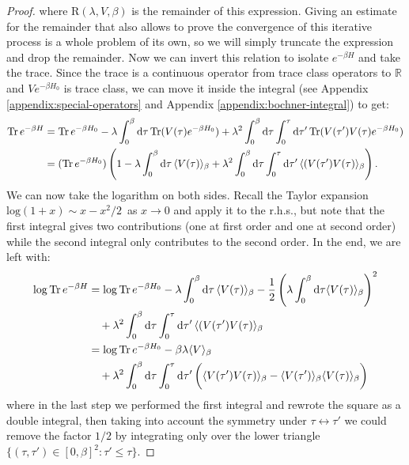 \begin{proof}
	where $\mathrm{R}(\lambda,V,\beta)$ is the remainder of this expression. Giving an
	estimate for the remainder that also allows to prove the convergence of this iterative
	process is a whole problem of its own, so we will simply truncate the expression and drop
	the remainder. Now we can invert this relation to isolate $e^{-\beta H}$ and take
	the trace. Since the trace is a continuous operator from trace class operators to $\mathbb{R}$
	and $Ve^{-\beta H_0}$ is trace class, we can move it inside the integral (see Appendix
	\ref{appendix:special-operators} and Appendix \ref{appendix:bochner-integral}) to get:
	\begin{align*}
		\mathrm{Tr} \, e^{-\beta H}
		&=
			\mathrm{Tr} \, e^{-\beta H_0}
			- \lambda\int_0^\beta\mathrm{d}\tau\, \mathrm{Tr}(V(\tau)e^{-\beta H_0})
			+ \lambda^2\int_0^\beta\mathrm{d}\tau\int_0^\tau\mathrm{d}\tau'\, \mathrm{Tr}(V(\tau')V(\tau)e^{-\beta H_0})\\
		&= (\mathrm{Tr}\,e^{-\beta H_0})\left(
			1 - \lambda\int_0^\beta\mathrm{d}\tau\,\langle V(\tau) \rangle_\beta
			+ \lambda^2\int_0^\beta\mathrm{d}\tau\int_0^\tau\mathrm{d}\tau'\, \langle (V(\tau')V(\tau) \rangle_\beta
			\right).
	\end{align*}
	We can now take the logarithm on both sides. Recall the Taylor expansion
	$\mathrm{log}(1+x) \sim x - x^2/2\,$ as $x \to 0$ and apply it to the r.h.s.,
	but note that the first integral gives two contributions (one at first
	order and one at second order) while the second integral only contributes to the second order.
	In the end, we are left with:
	\begin{align}
		\label{eq:duhamel}
		\mathrm{log}\,\mathrm{Tr}\,e^{-\beta H}
		&= \mathrm{log}\,\mathrm{Tr}\,e^{-\beta H_0}
			- \lambda\int_0^\beta\mathrm{d}\tau\,\langle V(\tau) \rangle_\beta
			- \frac{1}{2} \left( \lambda\int_0^\beta\mathrm{d}\tau \langle V(\tau) \rangle_\beta \right)^2 \nonumber \\
		&\quad + \lambda^2\int_0^\beta\mathrm{d}\tau\int_0^\tau\mathrm{d}\tau'\, \langle (V(\tau')V(\tau) \rangle_\beta \nonumber \\
		&= \mathrm{log}\,\mathrm{Tr}\,e^{-\beta H_0}
			- \beta \lambda\langle V \rangle_\beta \nonumber \\
		&\quad+ \lambda^2\int_0^\beta\mathrm{d}\tau\int_0^\tau\mathrm{d}\tau'\,\biggl(
				\langle V(\tau')V(\tau) \rangle_\beta - \langle V(\tau') \rangle_\beta \langle V(\tau) \rangle_\beta
			\biggr)
	\end{align}
	where in the last step we performed the first integral and rewrote the square as a double integral,
	then taking into account the symmetry under $\tau \longleftrightarrow \tau'$
	we could remove the factor $1/2$ by integrating only over the lower triangle $\{(\tau,\tau')\in[0,\beta]^2 : \tau' \leq \tau\}$.
\end{proof}

